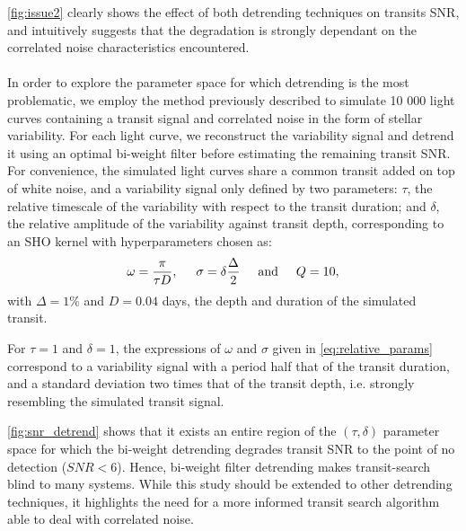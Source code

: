 \documentclass{aastex631}
\begin{document}
\noindent \autoref{fig:issue2} clearly shows the effect of both detrending techniques on transits SNR, and intuitively suggests that the degradation is strongly dependant on the correlated noise characteristics encountered.\\\\
In order to explore the parameter space for which detrending is the most problematic, we employ the method previously described to simulate 10 000 light curves containing a transit signal and correlated noise in the form of stellar variability. For each light curve, we reconstruct the variability signal and detrend it using an optimal bi-weight filter before estimating the remaining transit SNR. For convenience, the simulated light curves share a common transit added on top of white noise, and a variability signal only defined by two parameters: $\tau$, the relative timescale of the variability with respect to the transit duration; and $\delta$, the relative amplitude of the variability against transit depth, corresponding to an SHO kernel with hyperparameters chosen as: 
\begin{equation}\label{eq:relative_params}
    \omega = \frac{\pi}{\tau D}, \hspace{0.5cm} 
    \sigma = \delta \frac{\Delta}{2} \hspace{0.5cm}  \text{and}  \hspace{0.5cm}  
    Q = 10,
\end{equation}
with $\Delta=1\%$ and $D=0.04$ days, the depth and duration of the simulated transit. 

For $\tau=1$ and $\delta=1$, the expressions of $\omega$ and $\sigma$ given in \autoref{eq:relative_params} correspond to a variability signal with a period half that of the transit duration, and a standard deviation two times that of the transit depth, i.e. strongly resembling the simulated transit signal.

\autoref{fig:snr_detrend} shows that it exists an entire region of the $(\tau, \delta)$ parameter space for which the bi-weight detrending degrades transit SNR to the point of no detection ($SNR < 6$). Hence, bi-weight filter detrending makes transit-search blind to many systems. While this study should be extended to other detrending techniques, it highlights the need for a more informed transit search algorithm able to deal with correlated noise.
\end{document}
